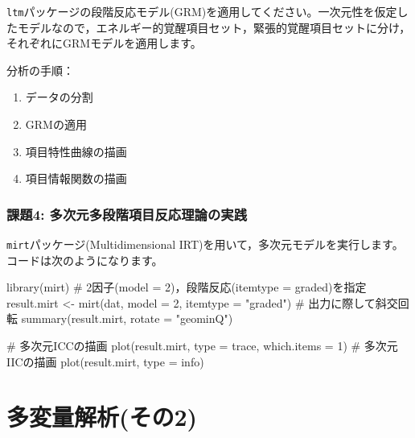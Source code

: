 \documentclass[
  a4paper,
]{ltjsbook}
\newenvironment{Shaded}{\begin{snugshade}}{\end{snugshade}}
\newcommand{\AttributeTok}[1]{\textcolor[rgb]{0.40,0.45,0.13}{#1}}
\newcommand{\CommentTok}[1]{\textcolor[rgb]{0.37,0.37,0.37}{#1}}
\newcommand{\DecValTok}[1]{\textcolor[rgb]{0.68,0.00,0.00}{#1}}
\newcommand{\FunctionTok}[1]{\textcolor[rgb]{0.28,0.35,0.67}{#1}}
\newcommand{\NormalTok}[1]{\textcolor[rgb]{0.00,0.23,0.31}{#1}}
\newcommand{\OtherTok}[1]{\textcolor[rgb]{0.00,0.23,0.31}{#1}}
\newcommand{\StringTok}[1]{\textcolor[rgb]{0.13,0.47,0.30}{#1}}
\providecommand{\tightlist}{%
  \setlength{\itemsep}{0pt}\setlength{\parskip}{0pt}}
\begin{document}
\texttt{ltm}パッケージの段階反応モデル(GRM)を適用してください。一次元性を仮定したモデルなので，エネルギー的覚醒項目セット，緊張的覚醒項目セットに分け，それぞれにGRMモデルを適用します。

分析の手順：

\begin{enumerate}
\def\labelenumi{\arabic{enumi}.}
\tightlist
\item
  データの分割
\item
  GRMの適用
\item
  項目特性曲線の描画
\item
  項目情報関数の描画
\end{enumerate}

\subsection{課題4:
多次元多段階項目反応理論の実践}\label{ux8ab2ux984c4-ux591aux6b21ux5143ux591aux6bb5ux968eux9805ux76eeux53cdux5fdcux7406ux8ad6ux306eux5b9fux8df5}

\texttt{mirt}パッケージ(Multidimensional
IRT)を用いて，多次元モデルを実行します。コードは次のようになります。

\begin{Shaded}
\begin{Highlighting}[]
\FunctionTok{library}\NormalTok{(mirt)}
\CommentTok{\# 2因子(model = 2)，段階反応(itemtype = \textquotesingle{}graded\textquotesingle{})を指定}
\NormalTok{result.mirt }\OtherTok{\textless{}{-}} \FunctionTok{mirt}\NormalTok{(dat, }\AttributeTok{model =} \DecValTok{2}\NormalTok{, }\AttributeTok{itemtype =} \StringTok{"graded"}\NormalTok{)}
\CommentTok{\# 出力に際して斜交回転}
\FunctionTok{summary}\NormalTok{(result.mirt, }\AttributeTok{rotate =} \StringTok{"geominQ"}\NormalTok{)}

\CommentTok{\# 多次元ICCの描画}
\FunctionTok{plot}\NormalTok{(result.mirt, }\AttributeTok{type =} \StringTok{\textquotesingle{}trace\textquotesingle{}}\NormalTok{, }\AttributeTok{which.items =} \DecValTok{1}\NormalTok{)}
\CommentTok{\# 多次元IICの描画}
\FunctionTok{plot}\NormalTok{(result.mirt, }\AttributeTok{type =} \StringTok{\textquotesingle{}info\textquotesingle{}}\NormalTok{)}
\end{Highlighting}
\end{Shaded}


\chapter{多変量解析(その2)}\label{ux591aux5909ux91cfux89e3ux6790ux305dux306e2}
\end{document}
